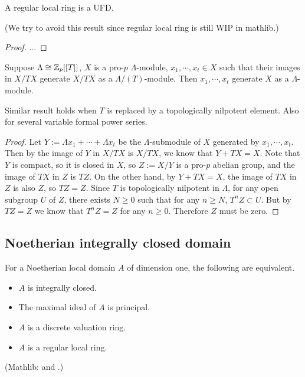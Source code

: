 \begin{thm}
\label{regular-local-ring-is-UFD}
A regular local ring is a UFD.

(We try to avoid this result since regular local ring is still WIP in mathlib.)
\end{thm}

\begin{proof}
...
\end{proof}

\begin{lem}\label{p:nak}
Suppose $\Lambda\cong{\mathbb {Z}}_p[[T]]$,
$X$ is a pro-$p$ $\Lambda$-module,
$x_1,\cdots,x_t\in X$ such that their images in $X/TX$
generate $X/TX$ as a $\Lambda/(T)$-module.
Then $x_1,\cdots,x_t$ generate $X$ as a $\Lambda$-module.
\end{lem}

Similar result holds when $T$ is replaced
by a topologically nilpotent element.
Also for several variable formal power series.

\begin{proof}
Let $Y:=\Lambda x_1+\cdots+\Lambda x_t$ be the $\Lambda$-submodule
of $X$ generated by $x_1,\cdots,x_t$.
Then by the image of $Y$ in $X/TX$ is $X/TX$,
we know that $Y+TX=X$. Note that $Y$ is compact,
so it is closed in $X$, so $Z:=X/Y$ is a pro-$p$ abelian group,
and the image of $TX$ in $Z$ is $TZ$.
On the other hand, by $Y+TX=X$, the image of $TX$ in $Z$
is also $Z$, so $TZ=Z$. Since $T$ is topologically nilpotent in $\Lambda$,
for any open subgroup $U$ of $Z$, there exists $N\geq 0$ such that
for any $n\geq N$, $T^nZ\subset U$. But by $TZ=Z$ we know that
$T^nZ=Z$ for any $n\geq 0$. Therefore $Z$ must be zero.
\end{proof}

\subsection{Noetherian integrally closed domain}

\begin{prop}
\label{noeth-local-domain-is-icd-iff}
\leanok
For a Noetherian local domain $A$ of dimension one, the following are equivalent.
\begin{itemize}
\item
$A$ is integrally closed.
\item
The maximal ideal of $A$ is principal.
\item
$A$ is a discrete valuation ring.
\item
$A$ is a regular local ring.
\end{itemize}
(Mathlib:  and
.)
\end{prop}

